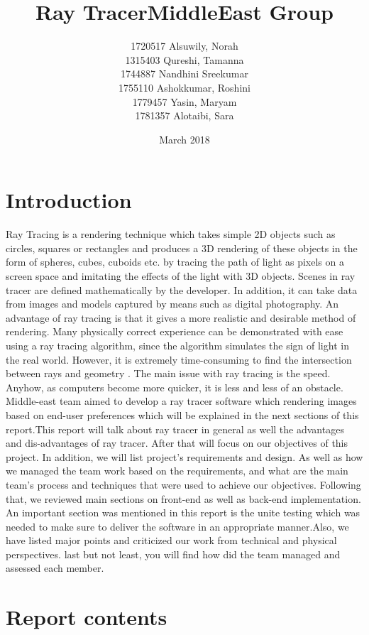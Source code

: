 \documentclass{article}
\title{Ray Tracer}
\title{MiddleEast Group}
\author{1720517 	Alsuwily, Norah \\ 1315403 	Qureshi, Tamanna \\
1744887 	Nandhini Sreekumar \\
1755110 	Ashokkumar, Roshini \\
1779457 	Yasin, Maryam \\
1781357 	Alotaibi, Sara }
\date{March 2018}
\begin{document}
\maketitle 

\section{Introduction}

Ray Tracing is a rendering technique which takes simple 2D objects such as circles, squares or rectangles and
produces a 3D rendering of these objects in the form of spheres, cubes, cuboids etc.  by tracing the path of light as pixels on a screen space and imitating the effects of the light  with 3D objects. Scenes in ray tracer are defined mathematically by the developer. In addition, it can take data from images and models captured by means such as digital photography. \newline An advantage of ray tracing is that it gives a more realistic and desirable method of rendering. Many physically correct experience can be demonstrated with ease using a ray tracing algorithm, since the algorithm simulates the sign of light in the real world.
However, it is extremely time-consuming to find the intersection between rays and geometry \cite{1}. The main issue with ray tracing is the speed. Anyhow, as computers become more quicker, it is less and less of an obstacle. Middle-east team aimed to develop a ray tracer software which rendering images based on end-user preferences which will be explained in the next sections of this report.This report will talk about ray tracer in general as well the advantages and dis-advantages of ray tracer. After that will focus on our objectives of this project. In addition, we will list project's requirements and design. As well as how we managed the team work based on the requirements, and what are the main team's process and techniques that were used to achieve our objectives.  Following that, we reviewed main sections on front-end as well as back-end implementation. An important section was mentioned in this report is the unite testing which was needed to make sure to deliver the software in an appropriate manner.Also, we have listed major points and criticized our work from technical and physical perspectives. last but not least, you will find how did the team managed and assessed each member. 

\section{Report contents}
\end{document}
